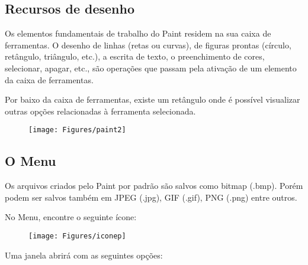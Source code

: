 \documentclass[hidelinks,12pt]{article}
\begin{document}
			\subsection{Recursos de desenho}	
			
			Os elementos fundamentais de trabalho do Paint residem na sua caixa de ferramentas. O desenho de linhas (retas ou curvas), de figuras prontas (círculo, retângulo, triângulo, etc.), a escrita de texto, o preenchimento de cores, selecionar, apagar, etc., são operações que passam pela ativação de um elemento da caixa de ferramentas. 
			
			Por baixo da caixa de ferramentas, existe um retângulo onde é possível visualizar outras opções relacionadas à ferramenta selecionada.
			
			
			\begin{figure}[!h]
				\centering
				\texttt{[image: Figures/paint2]}
				\label{fig:paint2}
			\end{figure}
			
			\subsection{O Menu}
			
			Os arquivos criados pelo Paint por padrão são salvos como bitmap (.bmp). Porém podem ser salvos também em JPEG (.jpg), GIF (.gif), PNG (.png) entre outros.
			
			No Menu, encontre o seguinte ícone:
			
			\begin{figure}[!h]
				\centering
				\texttt{[image: Figures/iconep]}
				\label{fig:paintp}
			\end{figure}
			
			Uma janela abrirá com as seguintes opções:
			
\end{document}
